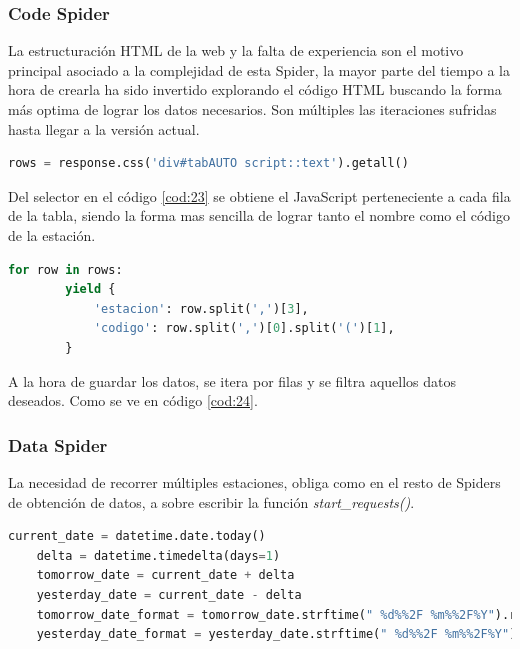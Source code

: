 \subsubsection{Code Spider}
La estructuración HTML de la web y la falta de experiencia son el motivo principal asociado a la complejidad de esta Spider, la mayor parte del tiempo a la hora de crearla ha sido invertido explorando el código HTML buscando la forma más optima de lograr los datos necesarios. Son múltiples las iteraciones sufridas hasta llegar a la versión actual.

\begin{lstlisting}[language=Python, caption={Selector en \textit{parse()} de MeteoNavarra Code Spider}, label=cod:23]
	rows = response.css('div#tabAUTO script::text').getall()
\end{lstlisting}

Del selector en el código \ref{cod:23} se obtiene el JavaScript perteneciente a cada fila de la tabla, siendo la forma mas sencilla de lograr tanto el nombre como el código de la estación.

\begin{lstlisting}[language=Python, caption={Guardado de datos de MeteoNavarra Code Spider}, label=cod:24]	
	for row in rows:
		yield {
			'estacion': row.split(',')[3],
			'codigo': row.split(',')[0].split('(')[1],
		}
\end{lstlisting}

A la hora de guardar los datos, se itera por filas y se filtra aquellos datos deseados. Como se ve en código \ref{cod:24}.

\subsubsection{Data Spider}
La necesidad de recorrer múltiples estaciones, obliga como en el resto de Spiders de obtención de datos, a sobre escribir la función \textit{start\_requests()}.

\begin{lstlisting}[language=Python, caption={Uso de fechas en función \textit{start\_requests()} MeteoNavarra Data Spider}, label=cod:25]
	current_date = datetime.date.today()
	delta = datetime.timedelta(days=1)
	tomorrow_date = current_date + delta
	yesterday_date = current_date - delta
	tomorrow_date_format = tomorrow_date.strftime(" %d%%2F %m%%2F%Y").replace(' 0', '')
	yesterday_date_format = yesterday_date.strftime(" %d%%2F %m%%2F%Y").replace(' 0', '')
\end{lstlisting}


